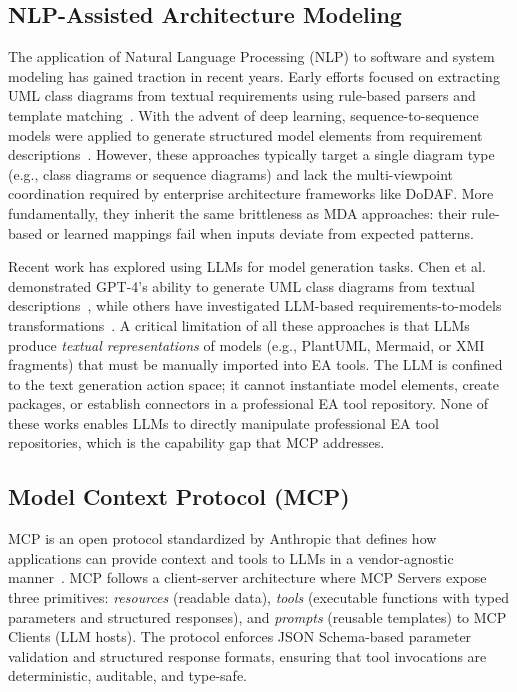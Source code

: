 \documentclass{ieeeaccess}
\begin{document}
\subsection{NLP-Assisted Architecture Modeling}

The application of Natural Language Processing (NLP) to software and system modeling has gained traction in recent years. Early efforts focused on extracting UML class diagrams from textual requirements using rule-based parsers and template matching~\cite{uml_nlp}. With the advent of deep learning, sequence-to-sequence models were applied to generate structured model elements from requirement descriptions~\cite{deep_modeling}. However, these approaches typically target a single diagram type (e.g., class diagrams or sequence diagrams) and lack the multi-viewpoint coordination required by enterprise architecture frameworks like DoDAF. More fundamentally, they inherit the same brittleness as MDA approaches: their rule-based or learned mappings fail when inputs deviate from expected patterns.

Recent work has explored using LLMs for model generation tasks. Chen et al. demonstrated GPT-4's ability to generate UML class diagrams from textual descriptions~\cite{gpt4_uml}, while others have investigated LLM-based requirements-to-models transformations~\cite{llm_requirements}. A critical limitation of all these approaches is that LLMs produce \emph{textual representations} of models (e.g., PlantUML, Mermaid, or XMI fragments) that must be manually imported into EA tools. The LLM is confined to the text generation action space; it cannot instantiate model elements, create packages, or establish connectors in a professional EA tool repository. None of these works enables LLMs to directly manipulate professional EA tool repositories, which is the capability gap that MCP addresses.

\subsection{Model Context Protocol (MCP)}

MCP is an open protocol standardized by Anthropic that defines how applications can provide context and tools to LLMs in a vendor-agnostic manner~\cite{mcp_spec}. MCP follows a client-server architecture where MCP Servers expose three primitives: \emph{resources} (readable data), \emph{tools} (executable functions with typed parameters and structured responses), and \emph{prompts} (reusable templates) to MCP Clients (LLM hosts). The protocol enforces JSON Schema-based parameter validation and structured response formats, ensuring that tool invocations are deterministic, auditable, and type-safe.
\end{document}
